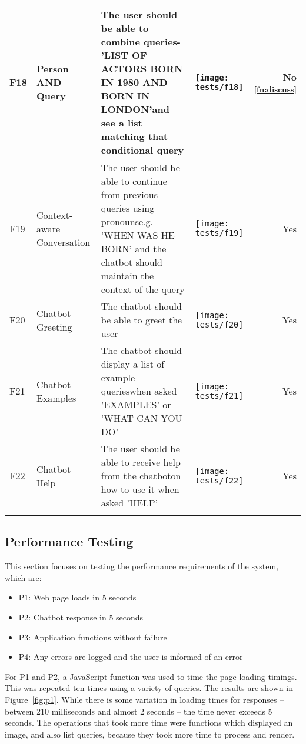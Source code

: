 \begin{landscape}
\begin{tabularx}{\hsize}{lXXXr}
		\midrule
		F18 & Person AND Query
		& The user should be able to combine queries\newline - 'LIST OF ACTORS BORN IN 1980 AND BORN IN LONDON'\newline and see a list matching that conditional query
		& \texttt{[image: tests/f18]} & No \textsuperscript{\ref{fn:discuss}} \\
		\midrule
		F19 & Context-aware Conversation
		& The user should be able to continue from previous queries using pronouns\newline e.g. 'WHEN WAS HE BORN' and the chatbot should maintain the context of the query
		& \texttt{[image: tests/f19]} & Yes \\
		\midrule
		F20 & Chatbot Greeting
		& The chatbot should be able to greet the user
		& \texttt{[image: tests/f20]} & Yes \\
		\midrule
		F21 & Chatbot Examples
		& The chatbot should display a list of example queries\newline when asked 'EXAMPLES' or 'WHAT CAN YOU DO'
		& \texttt{[image: tests/f21]} & Yes \\
		\midrule
		F22 & Chatbot Help
		& The user should be able to receive help from the chatbot\newline on how to use it when asked 'HELP'
		& \texttt{[image: tests/f22]} & Yes \\
		\bottomrule
		\caption{Requirements testing and evidence}
		\label{tab:testreq}
	\end{tabularx}
\end{landscape}

\newpage
\subsection{Performance Testing}
This section focuses on testing the performance requirements of the system, which are:
\begin{itemize}
	\item P1: Web page loads in 5 seconds
	\item P2: Chatbot response in 5 seconds
	\item P3: Application functions without failure
	\item P4: Any errors are logged and the user is informed of an error
\end{itemize}

For P1 and P2, a JavaScript function was used to time the page loading timings. This was repeated ten times using a variety of queries. The results are shown in Figure~\ref{fig:p1}. While there is some variation in loading times for responses -- between 210 milliseconds and almost 2 seconds -- the time never exceeds 5 seconds. The operations that took more time were functions which displayed an image, and also list queries, because they took more time to process and render.

